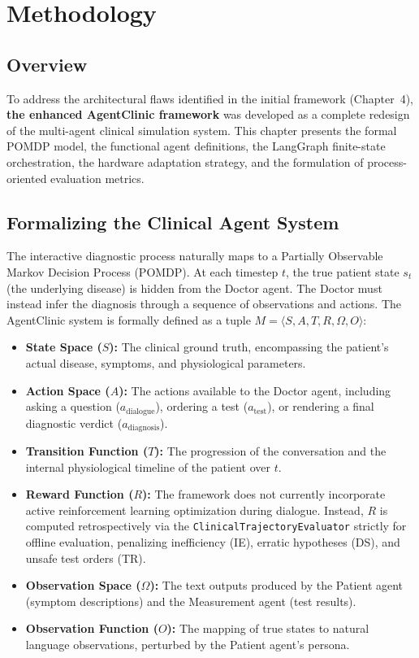 \chapter{Methodology}
\label{Chapter5}

\section{Overview}

To address the architectural flaws identified in the initial framework (Chapter~4), \textbf{the enhanced AgentClinic framework} was developed as a complete redesign of the multi-agent clinical simulation system. This chapter presents the formal POMDP model, the functional agent definitions, the LangGraph finite-state orchestration, the hardware adaptation strategy, and the formulation of process-oriented evaluation metrics.




\section{Formalizing the Clinical Agent System}

The interactive diagnostic process naturally maps to a Partially Observable Markov Decision Process (POMDP). At each timestep $t$, the true patient state $s_t$ (the underlying disease) is hidden from the Doctor agent. The Doctor must instead infer the diagnosis through a sequence of observations and actions. The AgentClinic system is formally defined as a tuple $M = \langle S, A, T, R, \Omega, O \rangle$:
\begin{itemize}
    \item \textbf{State Space ($S$):} The clinical ground truth, encompassing the patient's actual disease, symptoms, and physiological parameters.
    \item \textbf{Action Space ($A$):} The actions available to the Doctor agent, including asking a question ($a_{\text{dialogue}}$), ordering a test ($a_{\text{test}}$), or rendering a final diagnostic verdict ($a_{\text{diagnosis}}$).
    \item \textbf{Transition Function ($T$):} The progression of the conversation and the internal physiological timeline of the patient over $t$.
    \item \textbf{Reward Function ($R$):} The framework does not currently incorporate active reinforcement learning optimization during dialogue. Instead, $R$ is computed retrospectively via the \texttt{ClinicalTrajectoryEvaluator} strictly for offline evaluation, penalizing inefficiency (IE), erratic hypotheses (DS), and unsafe test orders (TR).
    \item \textbf{Observation Space ($\Omega$):} The text outputs produced by the Patient agent (symptom descriptions) and the Measurement agent (test results).
    \item \textbf{Observation Function ($O$):} The mapping of true states to natural language observations, perturbed by the Patient agent's persona.
\end{itemize}



